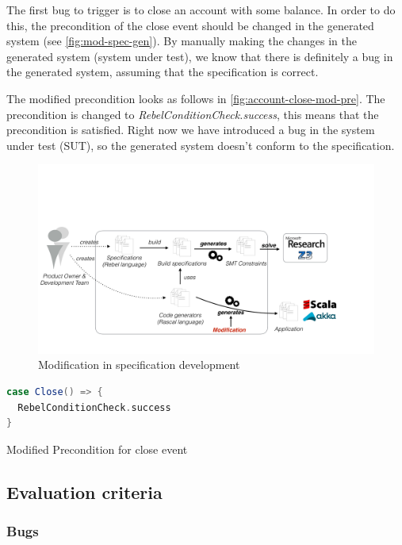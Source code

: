 The first bug to trigger is to close an account with some balance. In order to do this, the precondition of the close event should be changed in the generated system (see \autoref{fig:mod-spec-gen}). By manually making the changes in the generated system (system under test), we know that there is definitely a bug in the generated system, assuming that the specification is correct.

The modified precondition looks as follows in
\autoref{fig:account-close-mod-pre}. The precondition is changed to
\textit{RebelConditionCheck.success}, this means that the precondition is
satisfied. Right now we have introduced a bug in the system under test (SUT),
so the generated system doesn't conform to the specification.

\begin{figure}[h!]
  \centering
  \includegraphics[scale=0.26]{figures/mod-generated.pdf}
  \caption{Modification in specification development}\label{fig:mod-spec-gen}
\end{figure}
\FloatBarrier

\begin{sourcecode}[h!]
\begin{lstlisting}[language=scala]
case Close() => {
  RebelConditionCheck.success
}
\end{lstlisting}
\caption{Modified Precondition for close event}\label{fig:account-close-mod-pre}
\end{sourcecode}
\FloatBarrier

\subsection{Evaluation criteria}\label{sec:ch4-eval-criteria}

\subsubsection{Bugs}

